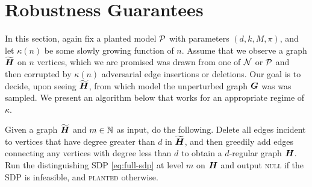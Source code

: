 \section{Robustness Guarantees} 
\label{sec:robust}

In this section, again fix a planted model $\mathcal{P}$ with parameters $(d,k,M,\pi)$, and let $\kappa(n)$ be some slowly growing function of $n$. Assume that we observe a graph $\widetilde{\boldsymbol{H}}$ on $n$ vertices, which we are promised was drawn from one of $\mathcal{N}$ or $\mathcal{P}$ and then corrupted by $\kappa(n)$ adversarial edge insertions or deletions. Our goal is to decide, upon seeing $\widetilde{\boldsymbol{H}}$, from which model the unperturbed graph $\boldsymbol{G}$ was was sampled. We present an algorithm below that works for an appropriate regime of $\kappa$. 

\begin{algorithm}	\label{alg:robust}
	Given a graph $\widetilde{\boldsymbol{H}}$ and $m \in \mathbb{N}$ as input, do the following.  Delete all edges incident to vertices that have degree greater than $d$ in $\widetilde{\boldsymbol{H}}$, and then greedily add edges connecting any vertices with degree less than $d$ to obtain a $d$-regular graph $\boldsymbol{H}$. Run the distinguishing SDP \eqref{eq:full-sdp} at level $m$ on $\boldsymbol{H}$ and output \textsc{null} if the SDP is infeasible, and \textsc{planted} otherwise.
\end{algorithm}

